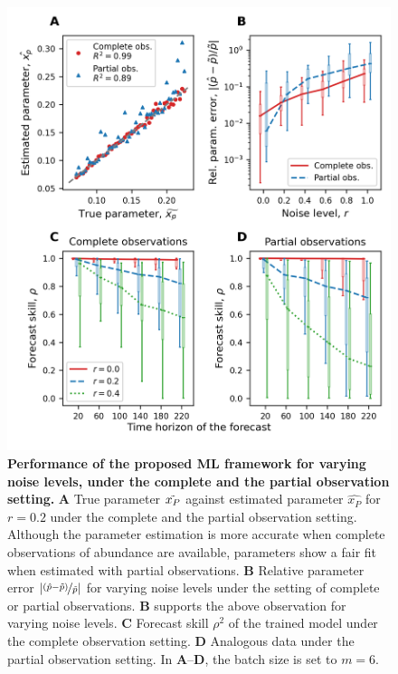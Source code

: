 \begin{figure}[h]
    \centering
    \includegraphics[]{figures/figure3.png}
    \caption{\textbf{Performance of the proposed ML framework for varying noise levels, under the complete and the partial observation setting.} 
    \textbf{A} True parameter $\Tilde{x_P}$ against estimated parameter $\hat{x_P}$ for $r = 0.2$ under the complete and the partial observation setting. Although the parameter estimation is more accurate when complete observations of abundance are available, parameters show a fair fit when estimated with partial observations. 
    \textbf{B} Relative parameter error $|\nicefrac{(\hat p -\Tilde{p})}{\Tilde{p}}|$ for varying noise levels under the setting of complete or partial observations. \textbf{B} supports the above observation for varying noise levels.
    \textbf{C} Forecast skill $\rho^2$ of the trained model under the complete observation setting.
    \textbf{D} Analogous data under the partial observation setting.
    In \textbf{A}--\textbf{D}, the batch size is set to $m = 6$.}
    \label{fig:perfect_setting_noise}
\end{figure}
\FloatBarrier

